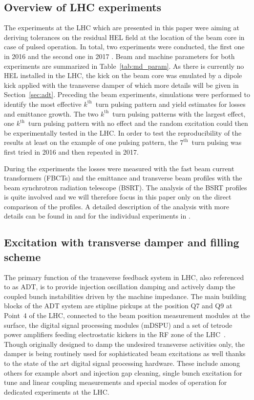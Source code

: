 \documentclass[%
 reprint,
 amsmath,amssymb,
 aps,
prstab,
]{revtex4-1}
\begin{document}
\subsection{Overview of LHC experiments\label{sec:exp_sum}}
The experiments at the LHC which are presented in this paper were aiming at deriving tolerances on the residual HEL field at the location of the beam core in case of pulsed operation. In total, two experiments were conducted, the first one in 2016 \cite{resexmd2016} and the second one in 2017 \cite{resexmd2017}. Beam and machine parameters for both experiments are summarized in Table~\ref{tab:md_param}. As there is currently no HEL installed in the LHC, the kick on the beam core was emulated by a dipole kick applied with the transverse damper of which more details will be given in Section~\ref{sec:adt}. Preceding the beam experiments, simulations were performed to identify the most effective $k^{\mathrm{th}}$~turn pulsing pattern and yield estimates for losses and emittance growth. The two $k^{\mathrm{th}}$~turn pulsing patterns with the largest effect, one $k^{\mathrm{th}}$~turn pulsing pattern with no effect and the random excitation could then be experimentally tested in the LHC. In order to test the reproducibility of the results at least on the example of one pulsing pattern, the $7^{\mathrm{th}}$~turn pulsing was first tried in 2016 and then repeated in 2017.

During the experiments the losses were measured with the fast beam current transformers (FBCTs) and the emittance and transverse beam profiles with the beam synchrotron radiation telescope (BSRT). The analysis of the BSRT profiles is quite involved and we will therefore focus in this paper only on the direct comparison of the profiles. A detailed description of the analysis with more details can be found in \cite{bsrtprofinj} and for the individual experiments in \cite{resexmd2016,resexmd2017}.

\subsection{Excitation with transverse damper and filling scheme\label{sec:adt}}
The primary function of the transverse feedback system in LHC, also referenced to as ADT, is to provide injection oscillation damping and actively damp the coupled bunch instabilities driven by the machine impedance. The main building blocks of the ADT system are stipline pickups at the position Q7 and Q9 at Point~4 of the LHC, connected to the beam position measurement modules at the surface, the digital signal processing modules (mDSPU) and a set of tetrode power amplifiers feeding electrostatic kickers in the RF zone of the LHC~\cite{adt_sum_2008,adt_sum_2011}. Though originally designed to damp the undesired transverse activities only, the damper is being routinely used for sophisticated beam excitations as well thanks to the state of the art digital signal processing hardware. These include among others for example abort and injection gap cleaning, single bunch excitation for tune and linear coupling measurements and special modes of operation for dedicated experiments at the LHC.
\end{document}

